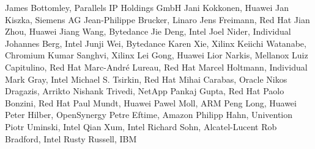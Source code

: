 James Bottomley,	Parallels IP Holdings GmbH	\newline
Jani Kokkonen, Huawei	\newline
Jan Kiszka,	Siemens AG	\newline
Jean-Philippe Brucker, Linaro \newline
Jens Freimann, Red Hat	\newline
Jian Zhou,	Huawei	\newline
Jiang Wang, Bytedance \newline
Jie Deng, Intel \newline
Joel Nider, Individual \newline
Johannes Berg, Intel \newline
Junji Wei, Bytedance \newline
Karen Xie, Xilinx	\newline
Keiichi Watanabe, Chromium \newline
Kumar Sanghvi, Xilinx	\newline
Lei Gong,	Huawei	\newline
Lior Narkis,	Mellanox	\newline
Luiz Capitulino,	Red Hat	\newline
Marc-André Lureau, Red Hat	\newline
Marcel Holtmann, Individual \newline
Mark Gray, Intel	\newline
Michael S. Tsirkin,	Red Hat	\newline
Mihai Carabas,	Oracle	\newline
Nikos Dragazis, Arrikto \newline
Nishank Trivedi, NetApp	\newline
Pankaj Gupta, Red Hat \newline
Paolo Bonzini,	Red Hat	\newline
Paul Mundt, Huawei	\newline
Pawel Moll,	ARM	\newline
Peng Long,	Huawei	\newline
Peter Hilber, OpenSynergy \newline
Petre Eftime, Amazon \newline
Philipp Hahn, Univention \newline
Piotr Uminski, Intel	\newline
Qian Xum, Intel	\newline
Richard Sohn,	Alcatel-Lucent	\newline
Rob Bradford, Intel \newline
Rusty Russell,	IBM	\newline
